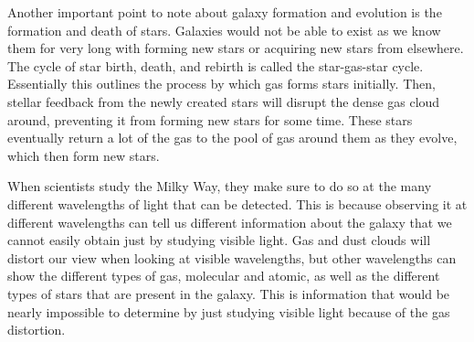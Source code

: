 \documentclass[12pt]{article}
\begin{document}
Another important point to note about galaxy formation and evolution is the
formation and death of stars.  Galaxies would not be able to exist as we know
them for very long with forming new stars or acquiring new stars from elsewhere.
The cycle of star birth, death, and rebirth is called the star-gas-star cycle.
Essentially this outlines the process by which gas forms stars initially.  Then,
stellar feedback from the newly created stars will disrupt the dense gas cloud
around, preventing it from forming new stars for some time.  These stars
eventually return a lot of the gas to the pool of gas around them as they
evolve, which then form new stars.

When scientists study the Milky Way, they make sure to do so at the many
different
wavelengths of light that can be detected.  This is because observing it at
different wavelengths can tell us different information about the galaxy that we
cannot easily obtain just by studying visible light.  Gas and dust clouds will
distort our view when looking at visible wavelengths, but other wavelengths can
show the different types of gas, molecular and atomic, as well as the different
types of stars that are present in the galaxy.  This is information that would
be nearly impossible to determine by just studying visible light because of the
gas distortion.
\end{document}
